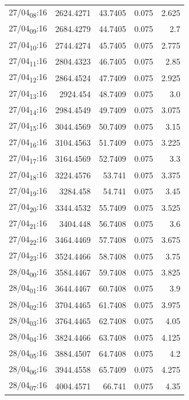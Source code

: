 \documentclass[11pt]{article}
\begin{document}
\begin{table}[htbp]
\begin{tabular}{lrrrr}
27/04\textsubscript{08}:16 & 2624.4271 & 43.7405 & 0.075 & 2.625\\[0pt]
27/04\textsubscript{09}:16 & 2684.4279 & 44.7405 & 0.075 & 2.7\\[0pt]
27/04\textsubscript{10}:16 & 2744.4274 & 45.7405 & 0.075 & 2.775\\[0pt]
27/04\textsubscript{11}:16 & 2804.4323 & 46.7405 & 0.075 & 2.85\\[0pt]
27/04\textsubscript{12}:16 & 2864.4524 & 47.7409 & 0.075 & 2.925\\[0pt]
27/04\textsubscript{13}:16 & 2924.454 & 48.7409 & 0.075 & 3.0\\[0pt]
27/04\textsubscript{14}:16 & 2984.4549 & 49.7409 & 0.075 & 3.075\\[0pt]
27/04\textsubscript{15}:16 & 3044.4569 & 50.7409 & 0.075 & 3.15\\[0pt]
27/04\textsubscript{16}:16 & 3104.4563 & 51.7409 & 0.075 & 3.225\\[0pt]
27/04\textsubscript{17}:16 & 3164.4569 & 52.7409 & 0.075 & 3.3\\[0pt]
27/04\textsubscript{18}:16 & 3224.4576 & 53.741 & 0.075 & 3.375\\[0pt]
27/04\textsubscript{19}:16 & 3284.458 & 54.741 & 0.075 & 3.45\\[0pt]
27/04\textsubscript{20}:16 & 3344.4532 & 55.7409 & 0.075 & 3.525\\[0pt]
27/04\textsubscript{21}:16 & 3404.448 & 56.7408 & 0.075 & 3.6\\[0pt]
27/04\textsubscript{22}:16 & 3464.4469 & 57.7408 & 0.075 & 3.675\\[0pt]
27/04\textsubscript{23}:16 & 3524.4466 & 58.7408 & 0.075 & 3.75\\[0pt]
28/04\textsubscript{00}:16 & 3584.4467 & 59.7408 & 0.075 & 3.825\\[0pt]
28/04\textsubscript{01}:16 & 3644.4467 & 60.7408 & 0.075 & 3.9\\[0pt]
28/04\textsubscript{02}:16 & 3704.4465 & 61.7408 & 0.075 & 3.975\\[0pt]
28/04\textsubscript{03}:16 & 3764.4465 & 62.7408 & 0.075 & 4.05\\[0pt]
28/04\textsubscript{04}:16 & 3824.4466 & 63.7408 & 0.075 & 4.125\\[0pt]
28/04\textsubscript{05}:16 & 3884.4507 & 64.7408 & 0.075 & 4.2\\[0pt]
28/04\textsubscript{06}:16 & 3944.4558 & 65.7409 & 0.075 & 4.275\\[0pt]
28/04\textsubscript{07}:16 & 4004.4571 & 66.741 & 0.075 & 4.35\\[0pt]

\end{tabular}
\end{table}
\end{document}
